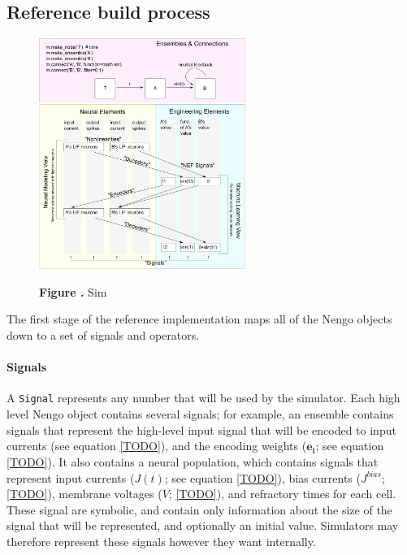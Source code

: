 \documentclass{frontiersSCNS}
\begin{document}
\subsection{Reference build process}

\begin{figure}
\begin{center}
  \includegraphics[width=0.6\textwidth]{sim}
\end{center}
 \textbf{\label{fig:sim} Figure .}{
   Sim}
\end{figure}

The first stage of the reference implementation
maps all of the Nengo objects
down to a set of signals and operators.

\paragraph{Signals}
A \texttt{Signal} represents any number that
will be used by the simulator.
Each high level Nengo object contains
several signals;
for example, an ensemble contains signals
that represent the high-level input
signal that will be encoded
to input currents (see equation \eqref{TODO}),
and the encoding weights
($\mathbf{e_i}$; see equation \eqref{TODO}).
It also contains a neural population,
which contains signals that represent
input currents
($J(t)$; see equation \eqref{TODO}),
bias currents ($J^{bias}$; \eqref{TODO}),
membrane voltages ($V$; \eqref{TODO}),
and refractory times for each cell.
These signal are symbolic,
and contain only information
about the size of the signal that will be represented,
and optionally an initial value.
Simulators may therefore represent
these signals however they want internally.
\end{document}
